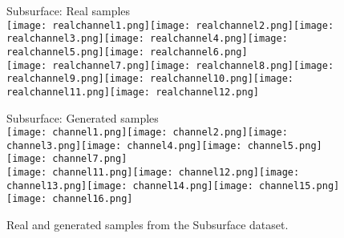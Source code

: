 \begin{figure}[t]
	\centering
	Subsurface: Real samples\\
	\texttt{[image: realchannel1.png]}\hspace{5px}\texttt{[image: realchannel2.png]}\hspace{5px}\texttt{[image: realchannel3.png]}\hspace{5px}\texttt{[image: realchannel4.png]}\hspace{5px}\texttt{[image: realchannel5.png]}\hspace{5px}\texttt{[image: realchannel6.png]}\\
	\vspace{0.1cm}
	\texttt{[image: realchannel7.png]}\hspace{5px}\texttt{[image: realchannel8.png]}\hspace{5px}\texttt{[image: realchannel9.png]}\hspace{5px}\texttt{[image: realchannel10.png]}\hspace{5px}\texttt{[image: realchannel11.png]}\hspace{5px}\texttt{[image: realchannel12.png]}
	
	Subsurface: Generated samples\\
	\texttt{[image: channel1.png]}\hspace{5px}\texttt{[image: channel2.png]}\hspace{5px}\texttt{[image: channel3.png]}\hspace{5px}\texttt{[image: channel4.png]}\hspace{5px}\texttt{[image: channel5.png]}\hspace{5px}\texttt{[image: channel7.png]}\\
	\vspace{0.1cm}
	\texttt{[image: channel11.png]}\hspace{5px}\texttt{[image: channel12.png]}\hspace{5px}\texttt{[image: channel13.png]}\hspace{5px}\texttt{[image: channel14.png]}\hspace{5px}\texttt{[image: channel15.png]}\hspace{5px}\texttt{[image: channel16.png]}\\
	
	\caption{Real and generated samples from the Subsurface dataset.}
	\label{fig:samples_subsurface}
\end{figure}



